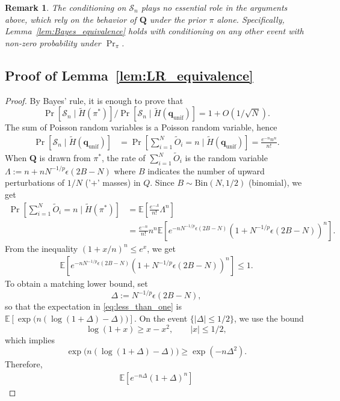\documentclass[11pt]{article}
\newtheorem{remark}[thm]{Remark}
\numberwithin{equation}{section}
\newcommand{\unif}{\mathrm{unif}}
\newcommand{\Bin}{\mathrm{Bin}}
\newcommand{\Scal}{\mathcal{S}}
\newcommand{\Prp}[1]{\Pr\left[#1 \right]}
\newcommand{\ex}[1]{\ensuremath{\mathbb{E}\left[ #1\right]}}
\begin{document}
\begin{remark}
The conditioning on $\Scal_n$ plays no essential role in the arguments above, which rely on the behavior of $\mathbf{Q}$ under the prior $\pi$ alone. Specifically, Lemma~\ref{lem:Bayes_equivalence} holds with conditioning on any other event with non-zero probability under $\Pr_\pi$. 
\end{remark}

\subsection{Proof of Lemma~\ref{lem:LR_equivalence}}
\label{sec:proof_LR_equivalence}
\begin{proof}
By Bayes' rule, it is enough to prove that
\[
    \Prp{\Scal_n \mid \tilde{H}(\pi^*)}/\Prp{ \Scal_n \mid \tilde{H}(\mathbf{q}_{\unif})} = 1+O(1/\sqrt{N}).
\]
The sum of Poisson random variables is a Poisson random variable, hence
\begin{align*}
\Prp{\Scal_n \mid \tilde{H}(\mathbf{q}_{\unif})} & = \Prp{\sum_{i=1}^N \tilde{O}_i = n \mid \tilde{H}(\mathbf{q}_{\unif})} = \frac{e^{-n}n^n}{n!}.
\end{align*}
When $\mathbf{Q}$ is drawn from $\pi^*$, the rate of $\sum_{i=1}^N \tilde{O}_i$ is the random variable $\Lambda := n + nN^{-1/p}\epsilon(2B-N)$ where $B$ indicates the number of upward perturbations of $1/N$ ('$+$' masses) in $Q$. Since $B \sim \Bin(N,1/2)$ (binomial), we get
\begin{align*}
    \Prp{\sum_{i=1}^N \tilde{O}_i = n \mid \tilde{H}(\pi^*)} & = \ex{ \frac{e^{-\Lambda}}{n!} \Lambda^n } \\
    & = \frac{e^{-n}}{n!}n^n \ex{ e^{-nN^{-1/p}\epsilon(2B-N)} \left(1 + N^{-1/p}\epsilon(2B-N)\right)^n }.
\end{align*}
From the inequality $(1+x/n)^n \leq e^x$, we get
\begin{align}
\label{eq:less_than_one}
\ex{ e^{-nN^{-1/p}\epsilon(2B-N)} \left(1 + N^{-1/p}\epsilon(2B-N)\right)^n } \leq 1.
\end{align}
To obtain a matching lower bound, set
\[
\Delta := N^{-1/p}\epsilon(2B-N),
\]
so that the expectation in \eqref{eq:less_than_one} is $\ex{\exp\big(n(\log(1+\Delta)-\Delta)\big)}$. On the event $\{|\Delta|\leq 1/2\}$, we use the bound
\[
\log(1+x) \geq x - x^2,\qquad |x|\leq 1/2,
\]
which implies
\[
\exp\big(n(\log(1+\Delta)-\Delta)\big) \geq \exp(-n\Delta^2).
\]
Therefore,
\begin{align}
\ex{ e^{-n\Delta}\left(1+\Delta\right)^n }

\end{align}
\end{proof}
\end{document}
